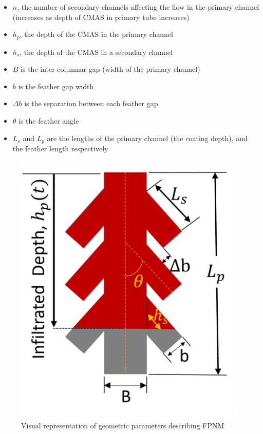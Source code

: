 \documentclass[%
 aip,
 amsmath,amssymb,
 reprint,%
]{revtex4-1}
\begin{document}
\begin{itemize}
    \item $n$, the number of secondary channels affecting the flow in the primary channel (increases as depth of CMAS in primary tube increases)
    \item $h_{p}$, the depth of the CMAS in the primary channel
    \item $h_{s}$, the depth of the CMAS in a secondary channel
    \item $B$ is the inter-columnar gap (width of the primary channel)
    \item $b$ is the feather gap width
    \item $\Delta b$ is the separation between each feather gap
    \item $\theta$ is the feather angle
    \item $L_{s}$ and $L_{p}$ are the lengths of the primary channel (the coating depth), and the feather length respectively
\end{itemize}

\begin{figure}
    \centering
    \includegraphics[width=\linewidth]{Figures/FPNM_cartoon.png}
    \caption{Visual representation of geometric parameters describing FPNM}
    \label{fig:FPNM_cartoon}
\end{figure}
\end{document}
